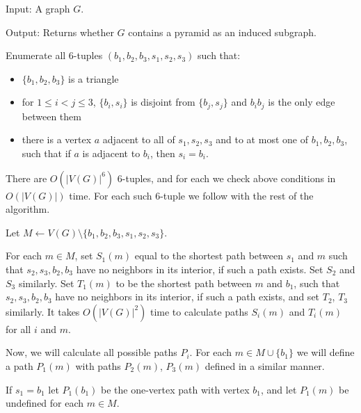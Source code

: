 
\begin{alg}
	\label{alg:testPyramid}
	Input: A graph $G$.

	\noindent Output: Returns whether $G$ contains a pyramid as an induced subgraph.
\end{alg}
\begin{algtext2}

	Enumerate all 6-tuples $(b_1, b_2, b_3, s_1, s_2, s_3)$ such that:
	\begin{itemize}
		\item $\{b_1, b_2, b_3\}$ is a triangle
		\item for $1 \leq i < j \leq 3$, $\{b_i, s_i\}$ is disjoint from $\{b_j, s_j\}$ and $b_ib_j$ is the only edge between them
		\item there is a vertex $a$ adjacent to all of $s_1, s_2, s_3$ and to at most one of $b_1, b_2, b_3$, such that if $a$ is adjacent to $b_i$, then $s_i = b_i$.
	\end{itemize}

	There are $O(|V(G)|^6)$ 6-tuples, and for each we check above conditions in $O(|V(G)|)$ time. For each such 6-tuple we follow with the rest of the algorithm.

	Let $M \leftarrow V(G) \setminus \{b_1, b_2, b_3, s_1, s_2, s_3\}$.

	For each $m \in M$, set $S_1(m)$ equal to the shortest path between $s_1$ and $m$ such that $s_2, s_3, b_2, b_3$ have no neighbors in its interior, if such a path exists. Set $S_2$ and $S_3$ similarly. Set $T_1(m)$ to be the shortest path between $m$ and $b_1$, such that $s_2, s_3, b_2, b_3$ have no neighbors in its interior, if such a path exists, and set $T_2$, $T_3$ similarly. It takes $O(|V(G)|^2)$ time to calculate paths $S_i(m)$ and $T_i(m)$ for all $i$ and $m$.

	Now, we will calculate all possible paths $P_i$. For each $m \in M \cup \{b_1\}$ we will define a path $P_1(m)$ with paths $P_2(m)$, $P_3(m)$ defined in a similar manner.

	If $s_1 = b_1$ let $P_1(b_1)$ be the one-vertex path with vertex $b_1$, and let $P_1(m)$ be undefined for each $m \in M$.


\end{algtext2}

